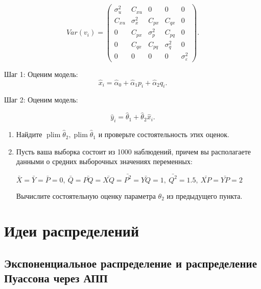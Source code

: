 \documentclass[10pt, a4paper]{extarticle}
\DeclareMathOperator{\plim}{plim}
\begin{document}
\[
Var(v_{i}) = \begin{pmatrix}  \sigma_{u}^2 & C_{xu} & 0 & 0 & 0\\
C_{xu} & \sigma_{x}^2  & C_{px} & C_{qx} & 0\\
0 & C_{px} & \sigma_p^2 & C_{pq}  & 0\\
0 & C_{qx} & C_{pq} & \sigma_q^2 & 0 \\
0 & 0 & 0 & 0 & \sigma_\varepsilon^2\end{pmatrix}.
\]

Шаг 1: Оценим модель:
\[
\hat{x}_i = \hat{\alpha}_0 + \hat{\alpha}_1 p_i + \hat{\alpha}_2 q_i.
\]

Шаг 2: Оценим модель:

\[
\hat{y}_i = \hat{\theta}_1 + \hat{\theta}_2 \hat{x}_i.
\]

\begin{enumerate}
	\item  Найдите $\plim \hat \theta_{2}, \plim \hat \theta_{1}$ и проверьте состоятельность этих оценок.
	
	\item Пусть ваша выборка состоит из 1000 наблюдений, причем вы располагаете данными о средних выборочных значениях переменных:
	
	$\bar{X} = \bar{Y} = \bar{P} = 0, \ \bar{Q} = \bar{PQ} = \bar{XQ} = \bar{P^2} = \bar{YQ} = 1, \ \bar{Q^2} = 1.5, \ \bar{XP} = \bar{YP} = 2$
	
	Вычислите состоятельную оценку параметра $\theta_2$ из предыдущего пункта.
\end{enumerate}



\section{Идеи распределений}

\subsection{Экспоненциальное распределение и распределение Пуассона через АПП}
\end{document}
